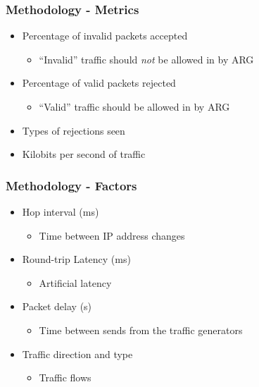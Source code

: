 \documentclass{beamer}
\begin{document}
\begin{frame}
	\frametitle{Methodology - Metrics}
	\begin{itemize}
	\item Percentage of invalid packets accepted
		\begin{itemize}
		\item ``Invalid'' traffic should \textit{not} be allowed in by ARG
		\end{itemize}
	\item Percentage of valid packets rejected
		\begin{itemize}
		\item ``Valid'' traffic should be allowed in by ARG
		\end{itemize}
	\item Types of rejections seen
	\item Kilobits per second of traffic
	\end{itemize}
\end{frame}

\begin{frame}
	\frametitle{Methodology - Factors}

	\begin{itemize}
	\item Hop interval (ms)
		\begin{itemize}
		\item Time between IP address changes
		\end{itemize}
	\item Round-trip Latency (ms)\\
		\begin{itemize}
		\item Artificial latency 
		\end{itemize}
	\item Packet delay (s)\\
		\begin{itemize}
		\item Time between sends from the traffic generators
		\end{itemize}
	\item Traffic direction and type\\
		\begin{itemize}
		\item Traffic flows
		\end{itemize}
	\end{itemize}
\end{frame}
\end{document}
